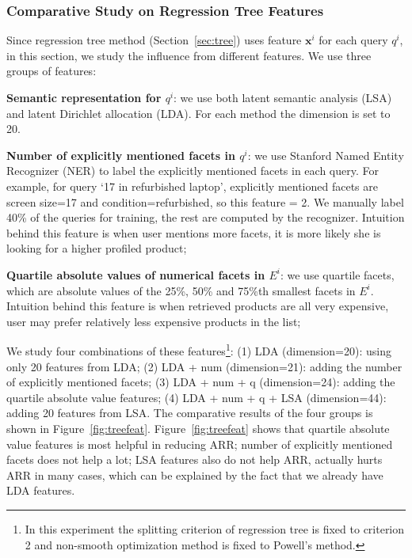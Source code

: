 \subsubsection{Comparative Study on Regression Tree Features}

Since regression tree method (Section~\ref{sec:tree}) uses feature $\mathbf{x}^i$ for each query $q^i$, in this section, we study the influence from different features. We use three groups of features:

\textbf{Semantic representation for $q^i$}: we use both latent semantic analysis (LSA) and latent Dirichlet allocation (LDA). For each method the dimension is set to 20. 


\textbf{Number of explicitly mentioned facets in $q^i$}: we use Stanford Named Entity Recognizer (NER) to label the explicitly mentioned facets in each query. For example, for query `17 in refurbished laptop', explicitly mentioned facets are screen size=17 and condition=refurbished, so this feature = 2. We manually label 40\% of the queries for training, the rest are computed by the recognizer. Intuition behind this feature is when user mentions more facets, it is more likely she is looking for a higher profiled product;

\textbf{Quartile absolute values of numerical facets in $E^i$}: we use quartile facets, which are absolute values of the 25\%, 50\% and 75\%th smallest facets in $E^i$. Intuition behind this feature is when retrieved products are all very expensive, user may prefer relatively less expensive products in the list;

 We study four combinations of these features\footnote{In this experiment the splitting criterion of regression tree is fixed to criterion 2 and non-smooth optimization method is fixed to Powell's method. }: (1) LDA (dimension=20): using only 20 features from LDA; (2) LDA + num (dimension=21): adding the number of explicitly mentioned facets; (3) LDA + num + q (dimension=24): \allowbreak adding the quartile absolute value features; (4) LDA + num + q + LSA (dimension=44): adding 20 features from LSA. The comparative results of the four groups is shown in Figure~\ref{fig:treefeat}. Figure~\ref{fig:treefeat} shows that quartile absolute value features is most helpful in reducing ARR; number of explicitly mentioned facets does not help a lot; LSA features also do not help ARR, actually hurts ARR in many cases, which can be explained by the fact that we already have LDA features. 

